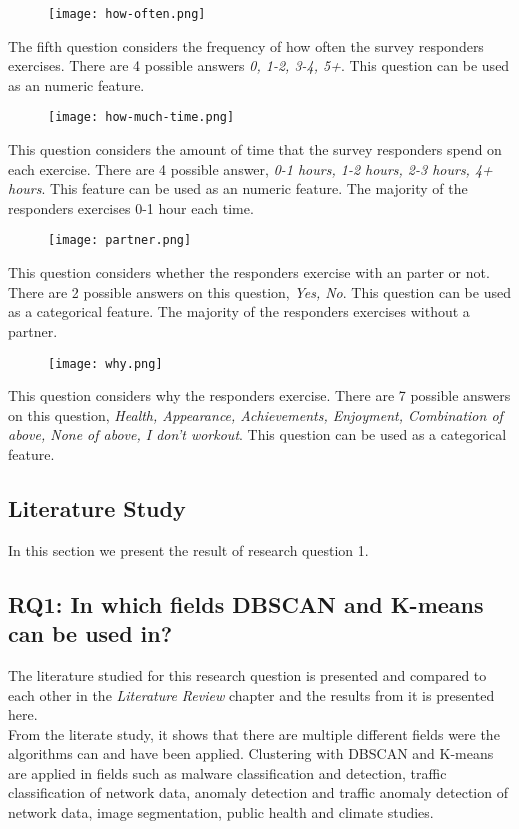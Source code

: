 \documentclass[a4paper]{article}
\begin{document}
\newpage


\begin{figure}[h]
\texttt{[image: how-often.png]}
\end{figure}

The fifth question considers the frequency of how often the survey responders exercises. There are 4 possible answers \textit{0, 1-2, 3-4, 5+}. 
This question can be used as an numeric feature. 

\begin{figure}[h]
\texttt{[image: how-much-time.png]}
\end{figure}
This question considers the amount of time that the survey responders spend on each exercise. There are 4 possible answer, \textit{0-1 hours, 1-2 hours, 2-3 hours, 4+ hours}. This feature can be used as an numeric feature. The majority of the responders exercises 0-1 hour each time.

\newpage
\begin{figure}[h]
\texttt{[image: partner.png]}
\end{figure}
This question considers whether the responders exercise with an parter or not. There are 2 possible answers on this question, \textit{Yes, No}. This question can be used as a categorical feature. The majority of the responders exercises without a partner. 

\begin{figure}[h]
\texttt{[image: why.png]}
\end{figure}
This question considers why the responders exercise. There are 7 possible answers on this question, \textit{Health, Appearance, Achievements, Enjoyment, Combination of above, None of above, I don't workout}. This question can be used as a categorical feature.

\newpage

\subsection{Literature Study}
In this section we present the result of research question 1.


\subsection{RQ1: In which fields DBSCAN and K-means can be used in?}
The literature studied for this research question is presented and compared to each other in the
\textit{Literature Review} chapter and the results from it is presented here. \newline\\From the literate study, it shows that there are multiple different fields were the algorithms can and have been applied. Clustering with DBSCAN and K-means are applied in fields such as malware classification and detection\cite{Kinable2011MalwareCB}, traffic classification of network data\cite{erman2006traffic}, anomaly detection\cite{airplane} and traffic anomaly detection of network data\cite{k-meansOutlier}, image segmentation\cite{imageSeg}\cite{k-meansDBSCANhybird},  public health\cite{imageSegBrain} and climate studies\cite{temperatur}.
\end{document}

